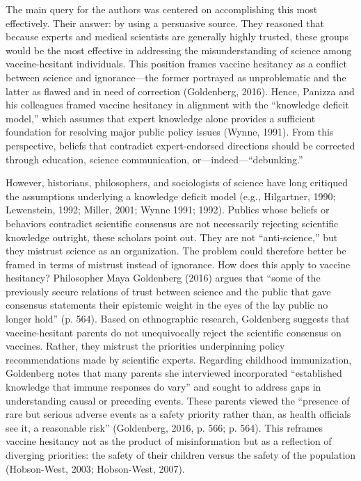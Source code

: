 \documentclass[authordate, reflection]{jote-new-article}
\begin{document}
	The main query for the authors was centered on accomplishing this most effectively. Their answer: by using a persuasive source. They reasoned that because experts and medical scientists are generally highly trusted, these groups would be the most effective in addressing the misunderstanding of science among vaccine-hesitant individuals. This position frames vaccine hesitancy as a conflict between science and ignorance—the former portrayed as unproblematic and the latter as flawed and in need of correction (Goldenberg, 2016). Hence, Panizza and his colleagues framed vaccine hesitancy in alignment with the “knowledge deficit model,” which assumes that expert knowledge alone provides a sufficient foundation for resolving major public policy issues (Wynne, 1991). From this perspective, beliefs that contradict expert-endorsed directions should be corrected through education, science communication, or—indeed—“debunking.”







	However, historians, philosophers, and sociologists of science have long critiqued the assumptions underlying a knowledge deficit model (e.g., Hilgartner, 1990; Lewenstein, 1992; Miller, 2001; Wynne 1991; 1992). Publics whose beliefs or behaviors contradict scientific consensus are not necessarily rejecting scientific knowledge outright, these scholars point out. They are not “anti-science,” but they mistrust science as an organization. The problem could therefore better be framed in terms of mistrust instead of ignorance. How does this apply to vaccine hesitancy? Philosopher Maya Goldenberg (2016) argues that “some of the previously secure relations of trust between science and the public that gave consensus statements their epistemic weight in the eyes of the lay public no longer hold” (p. 564). Based on ethnographic research, Goldenberg suggests that vaccine-hesitant parents do not unequivocally reject the scientific consensus on vaccines. Rather, they mistrust the priorities underpinning policy recommendations made by scientific experts. Regarding childhood immunization, Goldenberg notes that many parents she interviewed incorporated “established knowledge that immune responses do vary” and sought to address gaps in understanding causal or preceding events. These parents viewed the “presence of rare but serious adverse events as a safety priority rather than, as health officials see it, a reasonable risk” (Goldenberg, 2016, p. 566; p. 564). This reframes vaccine hesitancy not as the product of misinformation but as a reflection of diverging priorities: the safety of their children versus the safety of the population (Hobson-West, 2003; Hobson-West, 2007).
\end{document}
